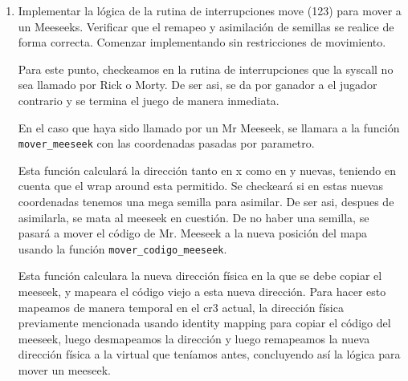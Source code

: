 \documentclass[a4paper]{article}
\begin{document}
\begin{enumerate}
	Finalmente incializaremos la tss del meeseek con la funci\'on \texttt{tss\_task\_init}. Esta funci\'on inicializa el cr3 de la tarea (asignandole el cr3 del jugador creador), copiando los 2kb de código desde la direcci\'on dada por \texttt{code\_start} y mapeandola en alguna direcci\'on virtual empezando desde 0x8000000 seg\'un corresponda. Luego, setearemos el esp0 en la base de la dirección que nos de la funci\'on \texttt{mmu\_next\_free\_kernel\_page}. Tomamos en cuenta la sugerencia dada por la catedra para reutilizar estas paginas cuando muera un Mr. Meeseek. 
	
	También seteamos su ss de nivel 0 para que tenga un selector de segmento de datos con RPL 0, mientras que los demas segmentos serán de datos o código según corresponda y con RPL 3 en todos los casos. Seteamos también tanto el ebp como el esp de esta tss para que apunten a la base de la segunda p\'agina mapeada. Activamos las interrupciones poniendo el valor del atributo eflags en 0x202 y por \'ultimo activamos el bit de presente asociado a esta tss.
	
	\item Implementar la lógica de la rutina de interrupciones move (123) para mover a un Meeseeks. Verificar que el remapeo y asimilación de semillas se realice de forma correcta. Comenzar implementando sin restricciones de movimiento.
	
	Para este punto, checkeamos en la rutina de interrupciones que la syscall no sea llamado por Rick o Morty. De ser asi, se da por ganador a el jugador contrario y se termina el juego de manera inmediata.
	
	En el caso que haya sido llamado por un Mr Meeseek, se llamara a la funci\'on \texttt{mover\_meeseek} con las coordenadas pasadas por parametro.
	
	Esta funci\'on calcular\'a la direcci\'on tanto en x como en y nuevas, teniendo en cuenta que el wrap around esta permitido. Se checkear\'a si en estas nuevas coordenadas tenemos una mega semilla para asimilar. De ser asi, despues de asimilarla, se mata al meeseek en cuesti\'on. De no haber una semilla, se pasar\'a a mover el código de Mr. Meeseek a la nueva posici\'on del mapa usando la funci\'on \texttt{mover\_codigo\_meeseek}.
	
	Esta funci\'on calculara la nueva direcci\'on física en la que se debe copiar el meeseek, y mapeara el código viejo a esta nueva dirección. Para hacer esto mapeamos de manera temporal en el cr3 actual, la direcci\'on física previamente mencionada usando identity mapping para copiar el código del meeseek, luego desmapeamos la dirección y luego remapeamos la nueva dirección física a la virtual que teníamos antes, concluyendo as\'i la lógica para mover un meeseek.
		

\end{enumerate}
\end{document}
